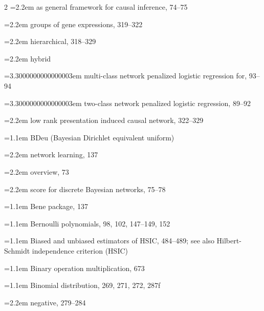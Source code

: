 \begin{multicols}{2}
\noindent\hangindent=2.2em \hspace*{1.1em}as general framework for causal inference, 74--75\par
\noindent\hangindent=2.2em \hspace*{1.1em}groups of gene expressions, 319--322\par
\noindent\hangindent=2.2em \hspace*{1.1em}hierarchical, 318--329\par
\noindent\hangindent=2.2em \hspace*{1.1em}hybrid\par
\noindent\hangindent=3.3000000000000003em \hspace*{2.2em}multi-class network penalized logistic regression for, 93--94\par
\noindent\hangindent=3.3000000000000003em \hspace*{2.2em}two-class network penalized logistic regression, 89--92\par
\noindent\hangindent=2.2em \hspace*{1.1em}low rank presentation induced causal network, 322--329\par
\noindent\hangindent=1.1em BDeu (Bayesian Dirichlet equivalent uniform)\par
\noindent\hangindent=2.2em \hspace*{1.1em}network learning, 137\par
\noindent\hangindent=2.2em \hspace*{1.1em}overview, 73\par
\noindent\hangindent=2.2em \hspace*{1.1em}score for discrete Bayesian networks, 75--78\par
\noindent\hangindent=1.1em Bene package, 137\par
\noindent\hangindent=1.1em Bernoulli polynomials, 98, 102, 147--149, 152\par
\noindent\hangindent=1.1em Biased and unbiased estimators of HSIC, 484--489; see also Hilbert-Schmidt independence criterion (HSIC)\par
\noindent\hangindent=1.1em Binary operation multiplication, 673\par
\noindent\hangindent=1.1em Binomial distribution, 269, 271, 272, 287f\par
\noindent\hangindent=2.2em \hspace*{1.1em}negative, 279--284\par

\end{multicols}
